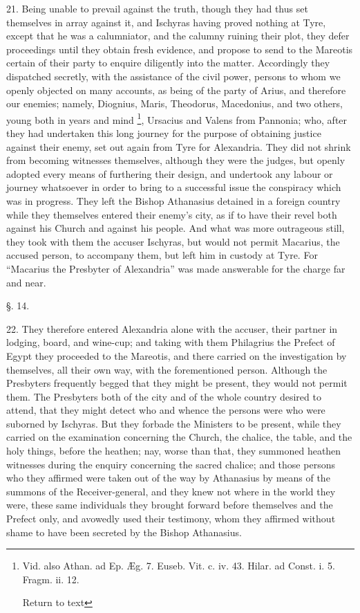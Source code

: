21. Being unable to prevail against the truth,
though they had thus set themselves in array against it, and Ischyras
having proved nothing at Tyre, except that he was a calumniator, and
the calumny ruining their plot, they defer proceedings until they
obtain fresh evidence, and propose to send to the Mareotis certain of
their party to enquire diligently into the matter. Accordingly they
dispatched secretly, with the assistance of the civil power, persons
to whom we openly objected on many accounts, as being of the party of
Arius, and therefore our enemies; namely, Diognius, Maris, Theodorus,
Macedonius, and two others, young both in years and mind \footnote{Vid. also Athan. ad Ep. Æg. 7. Euseb. Vit. c. iv. 43. Hilar. ad
Const. i. 5. Fragm. ii. 12.

Return to text}, Ursacius and Valens from Pannonia; who, after they had
undertaken this long journey for the purpose of obtaining justice
against their enemy, set out again from Tyre for Alexandria. They did
not shrink from becoming witnesses themselves, although they were the
judges, but openly adopted every means of furthering their design, and
undertook any labour or journey whatsoever in order to bring to a
successful issue the conspiracy which was in progress. They left the
Bishop Athanasius detained in a foreign country while they themselves
entered their enemy's city, as if to have their revel both against his
Church and against his people. And what was more outrageous still,
they took with them the accuser Ischyras, but would not permit
Macarius, the accused person, to accompany them, but left him in
custody at Tyre. For ``Macarius the Presbyter of Alexandria'' was made
answerable for the charge far and near.

§. 14.

22. They therefore entered Alexandria alone with
the accuser, their partner in lodging, board, and wine-cup; and taking
with them Philagrius the Prefect of Egypt they proceeded to the
Mareotis, and there carried on the investigation by themselves, all
their own way, with the forementioned person. Although the Presbyters
frequently begged that they might be present, they would not
permit them. The Presbyters both of the city and of the whole country
desired to attend, that they might detect who and whence the persons
were who were suborned by Ischyras. But they forbade the Ministers to
be present, while they carried on the examination concerning the
Church, the chalice, the table, and the holy things, before the
heathen; nay, worse than that, they summoned heathen witnesses during
the enquiry concerning the sacred chalice; and those persons who they
affirmed were taken out of the way by Athanasius by means of the
summons of the Receiver-general, and they knew not where in the world
they were, these same individuals they brought forward before
themselves and the Prefect only, and avowedly used their testimony,
whom they affirmed without shame to have been secreted by the Bishop
Athanasius.

